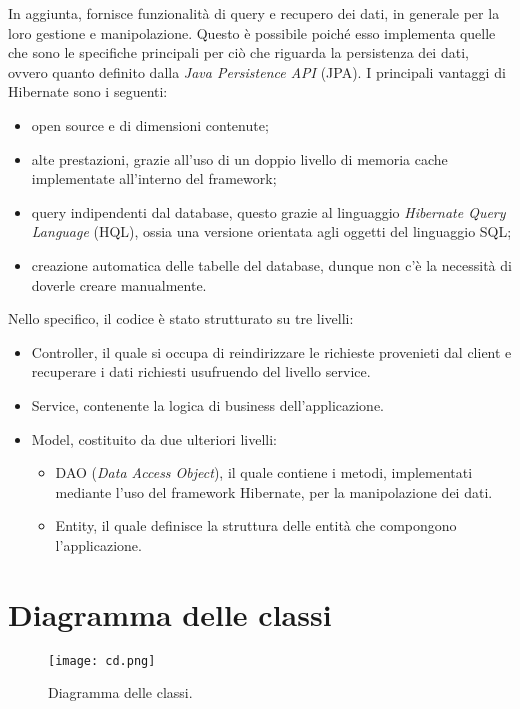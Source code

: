 \noindent
In aggiunta, fornisce funzionalità di query e recupero dei dati, in generale per la loro gestione e manipolazione. Questo è possibile poiché esso implementa quelle che sono le specifiche principali per ciò che riguarda la persistenza dei dati, ovvero quanto definito dalla \textit{Java Persistence API} (JPA). I principali vantaggi di Hibernate sono i seguenti: 
\begin{itemize}
    \item open source e di dimensioni contenute;
    \item alte prestazioni, grazie all'uso di un doppio livello di memoria cache implementate all'interno del framework;
    \item query indipendenti dal database, questo grazie al linguaggio \textit{Hibernate Query Language} (HQL), ossia una versione orientata agli oggetti del linguaggio SQL;
    \item creazione automatica delle tabelle del database, dunque non c'è la necessità di doverle creare manualmente.
\end{itemize}

\noindent
Nello specifico, il codice è stato strutturato su tre livelli:
\begin{itemize}
    \item Controller, il quale si occupa di reindirizzare le richieste provenieti dal client e recuperare i dati richiesti usufruendo del livello service.
    \item Service, contenente la logica di business dell'applicazione.
    \item Model, costituito da due ulteriori livelli: 
    \begin{itemize}
        \item DAO (\textit{Data Access Object}), il quale contiene i metodi, implementati mediante l'uso del framework Hibernate, per la manipolazione dei dati.
        \item Entity, il quale definisce la struttura delle entità che compongono l'applicazione.
    \end{itemize}
\end{itemize}

\clearpage
\section{Diagramma delle classi}
\begin{figure}[H]
	\centering
	\texttt{[image: cd.png]}
	\caption{Diagramma delle classi.}	
	\label{fig:cd}
\end{figure}

